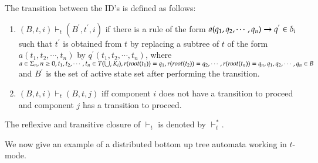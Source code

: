 The transition between the ID's is defined as follows:
\renewcommand{\theenumi}{\roman{enumi}}
\begin{enumerate}%
\item
$(B,t,i) \vdash_t (B^{'},t^{'},i)$ if
there is a rule of the form $a(q_1,q_2,\cdots,q_n) \rightarrow q^{'} \in \delta_i$ such that 
$t^{'}$ is obtained from $t$ by replacing a subtree of $t$ of the form
$a(t_1,t_2,\cdots,t_n)$ by $q^{'}(t_1,t_2,\cdots,t_n)$, where 
$a \in \Sigma_n,n \ge 0,t_1,t_2,\cdots,t_n \in T(\bigcup_i K_i),r(root(t_1))=q_1,
r(root(t_2))=q_2,\cdots , \\r(root(t_n)) = q_n,q_1,q_2,\cdots,q_n \in B$
and $B^{'}$ is the set of active state set after performing the transition.
 \item
$(B,t,i) \vdash_t (B,t,j) $ iff  component $i$ does not 
have a transition to proceed and component $j$ has a transition to proceed.
\end{enumerate}		
The reflexive and transitive closure of $\vdash_t $ is denoted by $\vdash_t^*$.
\begin{comment}
\begin{definition}
The language accepted by a DNTA $D=(K,\Sigma,F,\Delta)$ working in $t$-mode is
defined as follows:
\[L_t(D) = \{ t \in T(\Sigma) | (\phi,t,i) \vdash^*_t (\{q_f\},t^{'},j), t^{'} \in T(\bigcup_i K_i),
\mbox{ for some } q_f \in F, 1 \le i,j \le  n\}\]
\end{definition}
\end{comment}
We now give an example of a distributed bottom up tree automata working in $t$-mode.
